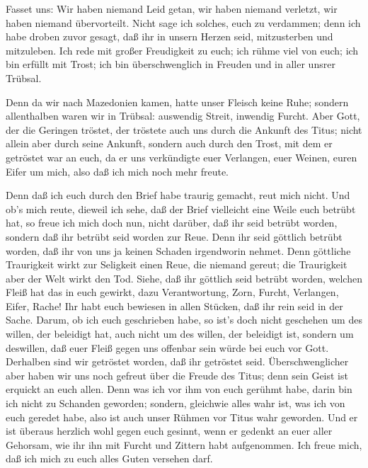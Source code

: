 Fasset uns: Wir haben niemand Leid getan, wir haben niemand
verletzt, wir haben niemand übervorteilt.  Nicht sage ich
solches, euch zu verdammen; denn ich habe droben zuvor gesagt, daß ihr
in unsern Herzen seid, mitzusterben und mitzuleben.  Ich
rede mit großer Freudigkeit zu euch; ich rühme viel von euch; ich bin
erfüllt mit Trost; ich bin überschwenglich in Freuden und in aller
unsrer Trübsal.

 Denn da wir nach Mazedonien kamen, hatte unser Fleisch
keine Ruhe; sondern allenthalben waren wir in Trübsal: auswendig Streit,
inwendig Furcht.  Aber Gott, der die Geringen tröstet, der
tröstete auch uns durch die Ankunft des Titus;  nicht allein
aber durch seine Ankunft, sondern auch durch den Trost, mit dem er
getröstet war an euch, da er uns verkündigte euer Verlangen, euer
Weinen, euren Eifer um mich, also daß ich mich noch mehr freute.

 Denn daß ich euch durch den Brief habe traurig gemacht,
reut mich nicht. Und ob's mich reute, dieweil ich sehe, daß der Brief
vielleicht eine Weile euch betrübt hat,  so freue ich mich
doch nun, nicht darüber, daß ihr seid betrübt worden, sondern daß ihr
betrübt seid worden zur Reue. Denn ihr seid göttlich betrübt worden, daß
ihr von uns ja keinen Schaden irgendworin nehmet.  Denn
göttliche Traurigkeit wirkt zur Seligkeit einen Reue, die niemand
gereut; die Traurigkeit aber der Welt wirkt den Tod. 
Siehe, daß ihr göttlich seid betrübt worden, welchen Fleiß hat das in
euch gewirkt, dazu Verantwortung, Zorn, Furcht, Verlangen, Eifer, Rache!
Ihr habt euch bewiesen in allen Stücken, daß ihr rein seid in der Sache.
 Darum, ob ich euch geschrieben habe, so ist's doch nicht
geschehen um des willen, der beleidigt hat, auch nicht um des willen,
der beleidigt ist, sondern um deswillen, daß euer Fleiß gegen uns
offenbar sein würde bei euch vor Gott.  Derhalben sind wir
getröstet worden, daß ihr getröstet seid. Überschwenglicher aber haben
wir uns noch gefreut über die Freude des Titus; denn sein Geist ist
erquickt an euch allen.  Denn was ich vor ihm von euch
gerühmt habe, darin bin ich nicht zu Schanden geworden; sondern,
gleichwie alles wahr ist, was ich von euch geredet habe, also ist auch
unser Rühmen vor Titus wahr geworden.  Und er ist überaus
herzlich wohl gegen euch gesinnt, wenn er gedenkt an euer aller
Gehorsam, wie ihr ihn mit Furcht und Zittern habt aufgenommen.
 Ich freue mich, daß ich mich zu euch alles Guten versehen
darf.

